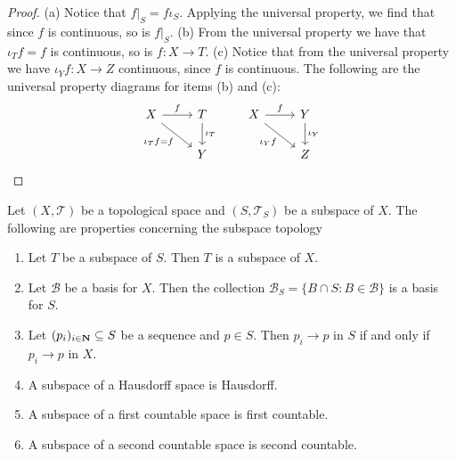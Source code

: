 \begin{proof}
  (a) Notice that \(f|_S = f  \iota_S\). Applying the universal property,
  we find that since \(f\) is continuous, so is \(f|_S\). (b) From the universal
  property we have that \(\iota_T  f = f\) is continuous, so is \(f: X \to
  T\). (c) Notice that from the universal property we have \(\iota_Y  f: X
  \to Z\) continuous, since \(f\) is continuous. The following are the universal
  property diagrams for items (b) and (c):
  \[
    \begin{tikzcd}
      X \rar["f"] \ar[rd, swap, "\iota_T  f = f"] &T \dar["\iota_T"] \\ &Y
    \end{tikzcd}
    \qquad
    \begin{tikzcd}
      X \rar["f"] \ar[rd, swap, "\iota_Y  f"] &Y \dar["\iota_Y"] \\ &Z
    \end{tikzcd}
  \]
\end{proof}

\begin{proposition}\label{prop: subspace properties}
  Let \((X, \mathcal T)\) be a topological space and \((S, \mathcal T_S)\) be a
  subspace of \(X\). The following are properties concerning the subspace
  topology
  \begin{enumerate}[(SP1)]
    \item\label{prop: subspace transitivity}
      Let \(T\) be a subspace of \(S\). Then \(T\) is a subspace of \(X\).  \item\label{prop: basis for subspace} Let \(\mathcal B\) be a basis for \(X\). Then the collection \(\mathcal B_S = \{B \cap S : B \in \mathcal B\}\) is a basis for \(S\).
    \item\label{prop: convergence subspace}
      Let \((p_i)_{i \in \mathbf{N}} \subseteq S\) be a sequence and \(p \in
      S\). Then \(p_i \to p\) in \(S\) if and only if \(p_i \to p\) in \(X\).
    \item\label{prop: Hausdorff implies Hausdorff subspace}
      A subspace of a Hausdorff space is Hausdorff.
    \item\label{prop: firs count implies first count subspace}
      A subspace of a first countable space is first countable.
    \item\label{prop: sec count implies sec count subspace}
      A subspace of a second countable space is second countable.
  \end{enumerate}
\end{proposition}

